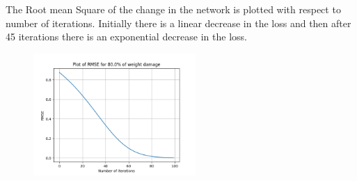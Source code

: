 \documentclass{article}
\begin{document}
\begin{figure}[H]
\hspace{0.001\textwidth}
\end{figure}

The Root mean Square of the change in the network is plotted with respect to number of iterations. Initially there is a linear decrease in the loss and then after 45 iterations there is an exponential decrease in the loss.
\begin{figure}[H]
\includegraphics[width=0.55\textwidth]{Figure_411.png}
\centering
\end{figure}

\end{document}
